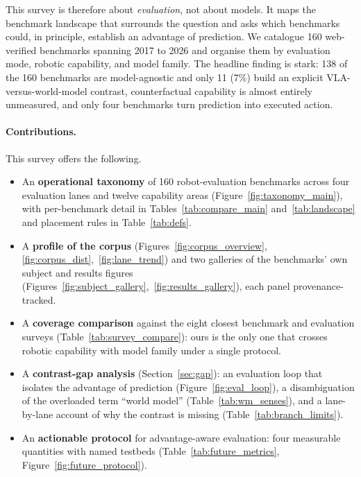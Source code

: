 This survey is therefore about \emph{evaluation}, not about models. It maps the benchmark landscape
that surrounds the question and asks which benchmarks could, in principle, establish an
advantage of prediction. We catalogue 160 web-verified benchmarks spanning 2017 to 2026 and organise
them by evaluation mode, robotic capability, and model family. The headline finding is stark: 138 of
the 160 benchmarks are model-agnostic and only 11 (7\%) build an explicit VLA-versus-world-model
contrast, counterfactual capability is almost entirely unmeasured, and only four benchmarks turn
prediction into executed action.

\paragraph{Contributions.} This survey offers the following.
\begin{itemize}
  \item An \textbf{operational taxonomy} of 160 robot-evaluation benchmarks across four evaluation
        lanes and twelve capability areas (Figure~\ref{fig:taxonomy_main}), with per-benchmark detail
        in Tables~\ref{tab:compare_main} and~\ref{tab:landscape} and placement rules in
        Table~\ref{tab:defs}.
  \item A \textbf{profile of the corpus} (Figures~\ref{fig:corpus_overview},
        \ref{fig:corpus_dist},~\ref{fig:lane_trend}) and two galleries of the benchmarks' own subject
        and results figures (Figures~\ref{fig:subject_gallery},~\ref{fig:results_gallery}), each panel
        provenance-tracked.
  \item A \textbf{coverage comparison} against the eight closest benchmark and evaluation surveys
        (Table~\ref{tab:survey_compare}): ours is the only one that crosses robotic capability with
        model family under a single protocol.
  \item A \textbf{contrast-gap analysis} (Section~\ref{sec:gap}): an evaluation loop that isolates
        the advantage of prediction (Figure~\ref{fig:eval_loop}), a disambiguation of the overloaded
        term ``world model'' (Table~\ref{tab:wm_senses}), and a lane-by-lane account of why the
        contrast is missing (Table~\ref{tab:branch_limits}).
  \item An \textbf{actionable protocol} for advantage-aware evaluation: four measurable quantities
        with named testbeds (Table~\ref{tab:future_metrics}, Figure~\ref{fig:future_protocol}).
\end{itemize}

